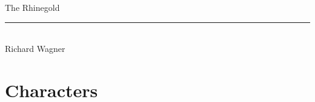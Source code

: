 \documentclass[10.5pt,openany]{book}
\begin{document}
\frontmatter

\begin{titlepage}
\thispagestyle{empty}
\vspace*{3.2cm}
\begin{center}
{\Huge The Rhinegold}\\[3.4ex]
{\color{rule}\rule{0.4\textwidth}{0.4pt}}\\[3.2ex]
{\large Richard Wagner}
\end{center}
\vfill
\end{titlepage}

\tableofcontents
{}

\mainmatter

\chapter*{Characters}
\end{document}
